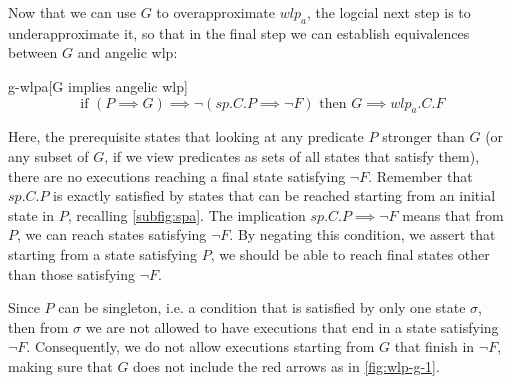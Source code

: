 Now that we can use $G$ to overapproximate $wlp_a$, the logcial next step is to underapproximate it, so that in the final step we can establish equivalences between $G$ and angelic wlp:
\begin{lemma}{g-wlpa}[G implies angelic wlp]
\ \\ \vspace{-3mm}
	\[%
	\text{ if \ \ \ \ } 
	(P{\implies} G) \implies \neg(sp.C.P {\implies} \neg F)
	\text{\ \ \ \  then\ \ \ \  } 
	G {\implies} wlp_a.C.F
	\] 
\end{lemma}
Here, the prerequisite states that looking at any predicate $P$ stronger than $G$ (or any subset of $G$, if we view predicates as sets of all states that satisfy them), there are no executions reaching a final state satisfying $\neg F$. 
Remember that $sp.C.P$ is exactly satisfied by states that can be reached starting from an initial state in $P$, recalling \autoref{subfig:spa}. 
The implication $sp.C.P \implies \neg F$ means that from $P$, we can  reach states satisfying $\neg F$. 
By negating this condition, we assert that starting from a state satisfying $P$, we should be able to reach final states other than those satisfying $\neg F$. 

Since $P$ can be singleton, i.e. a condition that is satisfied by only one state $\sigma$, then from $\sigma$ we are not allowed to  have executions that end in a state satisfying $\neg F$. 
Consequently, we do not allow executions starting from $G$ that  finish in $\neg F$, making sure that $G$ does not include the red arrows as in \autoref{fig:wlp-g-1}.  

